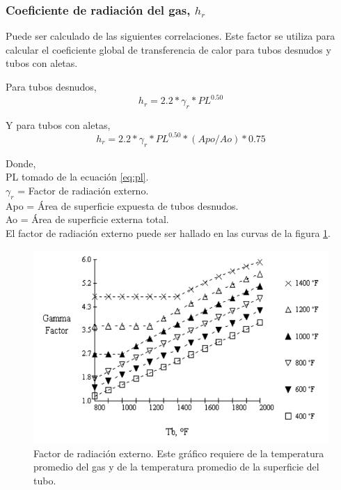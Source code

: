 \subsubsection{Coeficiente de radiación del gas, $h_r$}
\par Puede ser calculado de las siguientes correlaciones. Este factor se utiliza para calcular el coeficiente global de transferencia de calor para tubos desnudos y tubos con aletas. 

Para tubos desnudos,
\begin{equation*}
h_r = 2.2 *\gamma_r *PL^{0.50}
\end{equation*}

\par Y para tubos con aletas,
\begin{equation*}
h_r = 2.2 *\gamma_r *PL^{0.50} *(Apo/Ao) *0.75
\end{equation*}

\par Donde,\\
PL tomado de la ecuación \ref{eq:pl}.\\
$\gamma_r$ = Factor de radiación externo.\\
Apo = Área de superficie expuesta de tubos desnudos.\\
Ao = Área de superficie externa total. \\

El factor de radiación externo puede ser hallado en las curvas de la figura \ref{fig:gamma}.

\begin{figure}[hbt]
\begin{center}
\includegraphics[scale=0.45]{images/gamma}
\caption[Factor de radiación externo]{Factor de radiación externo. Este gráfico requiere de la temperatura promedio del gas y de la temperatura promedio de la superficie del tubo.}
\label{fig:gamma}
\end{center}
\end{figure}

